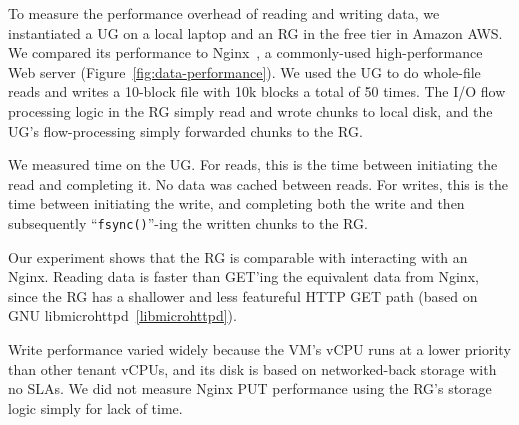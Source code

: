 To measure the performance overhead of reading and writing data, we instantiated
a UG on a local laptop and an RG in the free tier in Amazon AWS.  We compared
its performance to Nginx~\cite{nginx}, a commonly-used high-performance Web
server (Figure~\ref{fig:data-performance}).  We used the UG to do whole-file
reads and writes a 10-block file with 10k blocks a total of 50 times.
The I/O flow processing logic in the RG simply read and
wrote chunks to local disk, and the UG's flow-processing simply
forwarded chunks to the RG.

We measured time on the UG.  For reads, this is the time between initiating the
read and completing it.  No data was cached between reads.  For writes, this is
the time between initiating the write, and completing both the write and then
subsequently ``\texttt{fsync()}''-ing the written chunks to the RG.

Our experiment shows that the RG is comparable with interacting with an Nginx.
Reading data is faster than GET'ing the equivalent data from Nginx,
since the RG has a shallower and less featureful HTTP GET path (based on
GNU libmicrohttpd~\ref{libmicrohttpd}).

Write performance varied widely because the VM's vCPU runs at a lower priority
than other tenant vCPUs, and its disk is based on networked-back storage with no
SLAs.  We did not measure Nginx PUT performance using the RG's storage logic
simply for lack of time.


